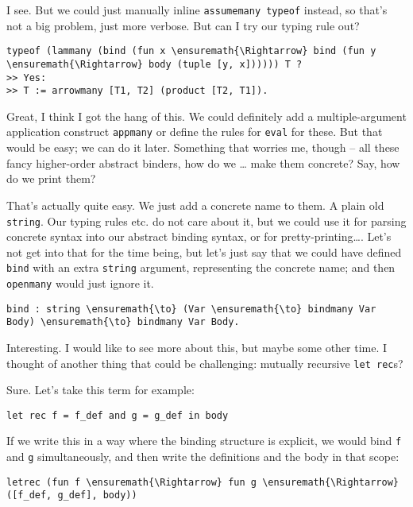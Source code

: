 \heroSTUDENT{} I see. But we could just manually inline
\texttt{assumemany\ typeof} instead, so that's not a big problem, just
more verbose. But can I try our typing rule out?

\begin{verbatim}
typeof (lammany (bind (fun x \ensuremath{\Rightarrow} bind (fun y \ensuremath{\Rightarrow} body (tuple [y, x]))))) T ?
>> Yes:
>> T := arrowmany [T1, T2] (product [T2, T1]).
\end{verbatim}

Great, I think I got the hang of this. We could definitely add a
multiple-argument application construct \texttt{appmany} or define the
rules for \texttt{eval} for these. But that would be easy; we can do it
later. Something that worries me, though -- all these fancy higher-order
abstract binders, how do we \ldots{} make them concrete? Say, how do we
print them?

\heroADVISOR{} That's actually quite easy. We just add a concrete name to
them. A plain old \texttt{string}. Our typing rules etc. do not care
about it, but we could use it for parsing concrete syntax into our
abstract binding syntax, or for pretty-printing\ldots{}. Let's not get
into that for the time being, but let's just say that we could have
defined \texttt{bind} with an extra \texttt{string} argument,
representing the concrete name; and then \texttt{openmany} would just
ignore it.

\begin{verbatim}
bind : string \ensuremath{\to} (Var \ensuremath{\to} bindmany Var Body) \ensuremath{\to} bindmany Var Body.
\end{verbatim}

\heroSTUDENT{} Interesting. I would like to see more about this, but maybe
some other time. I thought of another thing that could be challenging:
mutually recursive \texttt{let\ rec}s?

\heroADVISOR{} Sure. Let's take this term for example:

\begin{verbatim}
let rec f = f_def and g = g_def in body
\end{verbatim}

If we write this in a way where the binding structure is explicit, we
would bind \texttt{f} and \texttt{g} simultaneously, and then write the
definitions and the body in that scope:

\begin{verbatim}
letrec (fun f \ensuremath{\Rightarrow} fun g \ensuremath{\Rightarrow} ([f_def, g_def], body))
\end{verbatim}

